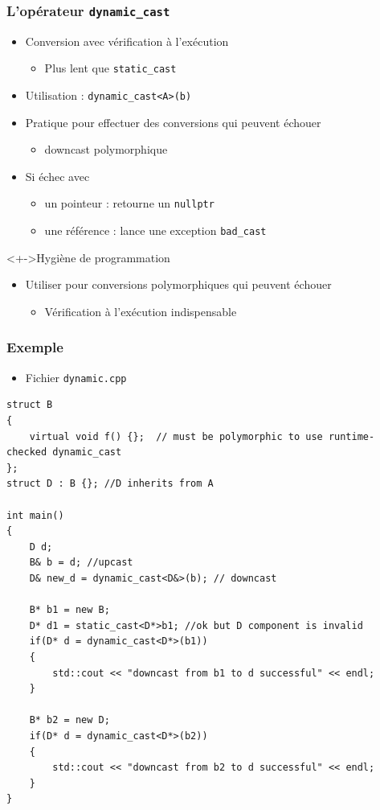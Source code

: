 \begin{frame}
\frametitle{L'opérateur \texttt{dynamic\_cast}}
\begin{itemize}[<+->]
\item Conversion avec vérification à l'exécution
	\begin{itemize}
	\item Plus lent que \lstinline|static_cast|
	\end{itemize}
\item Utilisation : \lstinline|dynamic_cast<A>(b)|
\item Pratique pour effectuer des conversions qui peuvent échouer
	\begin{itemize}
	\item downcast polymorphique	
	\end{itemize}
\item Si échec avec 
	\begin{itemize}
	\item un pointeur : retourne un \lstinline|nullptr|
	\item une référence : lance une exception \texttt{bad\_cast}
	\end{itemize}
\end{itemize}
\begin{block}<+->{Hygiène de programmation}
	\begin{itemize}[<+->]
	\item Utiliser pour conversions polymorphiques qui peuvent échouer
		\begin{itemize}
		\item Vérification à l'exécution indispensable
		\end{itemize}
	\end{itemize}
\end{block}
\end{frame}

\begin{frame}[containsverbatim]
\frametitle{Exemple}
\begin{itemize}
\item Fichier \texttt{dynamic.cpp}
\end{itemize}
\begin{lstlisting}
struct B 
{
    virtual void f() {};  // must be polymorphic to use runtime-checked dynamic_cast
};
struct D : B {}; //D inherits from A
 
int main()
{
    D d;
    B& b = d; //upcast
    D& new_d = dynamic_cast<D&>(b); // downcast
 
    B* b1 = new B;
    D* d1 = static_cast<D*>b1; //ok but D component is invalid
    if(D* d = dynamic_cast<D*>(b1))
    {
        std::cout << "downcast from b1 to d successful" << endl;
    }
 
    B* b2 = new D;
    if(D* d = dynamic_cast<D*>(b2))
    {
        std::cout << "downcast from b2 to d successful" << endl;
    }
}
\end{lstlisting}
\end{frame}

